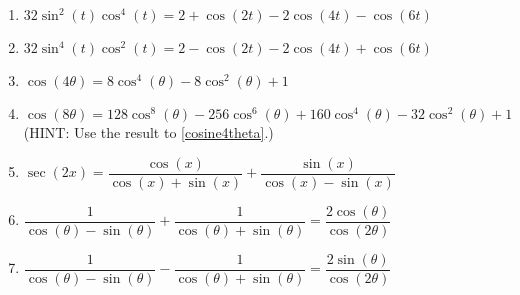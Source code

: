 \documentclass{ximera}
\begin{document}
\begin{enumerate}

\setcounter{enumi}{\value{HW}}

\item  $32\sin^{2}(t) \cos^{4}(t) = 2 + \cos(2t) - 2\cos(4t) - \cos(6t)$
\item  $32\sin^{4}(t) \cos^{2}(t) = 2 - \cos(2t) - 2\cos(4t) + \cos(6t)$
\item \label{cosine4theta} $\cos(4\theta) = 8\cos^{4}(\theta) - 8\cos^{2}(\theta) + 1$
\item  $\cos(8\theta) = 128\cos^{8}(\theta)-256\cos^{6}(\theta)+160\cos^{4}(\theta)-32\cos^{2}(\theta)+1$ (HINT:  Use the result to \ref{cosine4theta}.)
\item  $\sec(2x) = \dfrac{\cos(x)}{\cos(x) + \sin(x)} + \dfrac{\sin(x)}{\cos(x)-\sin(x)}$ 
\item  $\dfrac{1}{\cos(\theta) - \sin(\theta)} + \dfrac{1}{\cos(\theta) + \sin(\theta)} = \dfrac{2\cos(\theta)}{\cos(2\theta)}$
\item  $\dfrac{1}{\cos(\theta) - \sin(\theta)} - \dfrac{1}{\cos(\theta) + \sin(\theta)} = \dfrac{2\sin(\theta)}{\cos(2\theta)}$ \label{moreidentlast}

\setcounter{HW}{\value{enumi}}

\end{enumerate}

\pagebreak
\end{document}

